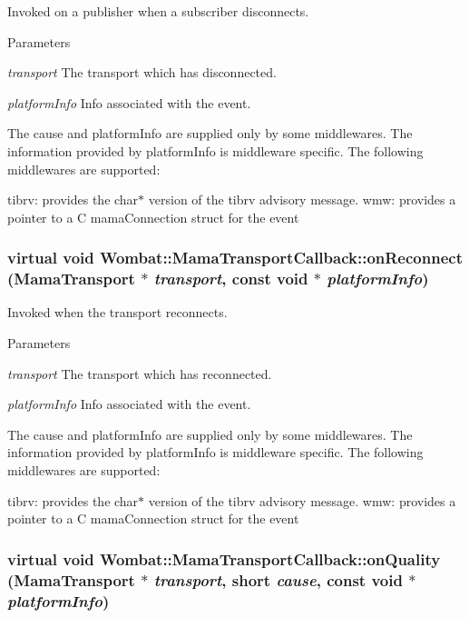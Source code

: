 Invoked on a publisher when a subscriber disconnects. 
\begin{DoxyParams}{Parameters}
\item[{\em transport}]The transport which has disconnected. \item[{\em platformInfo}]Info associated with the event.\end{DoxyParams}
The cause and platformInfo are supplied only by some middlewares. The information provided by platformInfo is middleware specific. The following middlewares are supported:

tibrv: provides the char$\ast$ version of the tibrv advisory message. wmw: provides a pointer to a C mamaConnection struct for the event \hypertarget{classWombat_1_1MamaTransportCallback_a209c2036256c70eee70b0f3bdbd1a558}{
\subsubsection[{onReconnect}]{\setlength{\rightskip}{0pt plus 5cm}virtual void Wombat::MamaTransportCallback::onReconnect ({\bf MamaTransport} $\ast$ {\em transport}, \/  const void $\ast$ {\em platformInfo})}}
\label{classWombat_1_1MamaTransportCallback_a209c2036256c70eee70b0f3bdbd1a558}


Invoked when the transport reconnects. 
\begin{DoxyParams}{Parameters}
\item[{\em transport}]The transport which has reconnected. \item[{\em platformInfo}]Info associated with the event.\end{DoxyParams}
The cause and platformInfo are supplied only by some middlewares. The information provided by platformInfo is middleware specific. The following middlewares are supported:

tibrv: provides the char$\ast$ version of the tibrv advisory message. wmw: provides a pointer to a C mamaConnection struct for the event \hypertarget{classWombat_1_1MamaTransportCallback_a87ae633ef0a08074178173b5901224cc}{
\subsubsection[{onQuality}]{\setlength{\rightskip}{0pt plus 5cm}virtual void Wombat::MamaTransportCallback::onQuality ({\bf MamaTransport} $\ast$ {\em transport}, \/  short {\em cause}, \/  const void $\ast$ {\em platformInfo})}}
\label{classWombat_1_1MamaTransportCallback_a87ae633ef0a08074178173b5901224cc}


